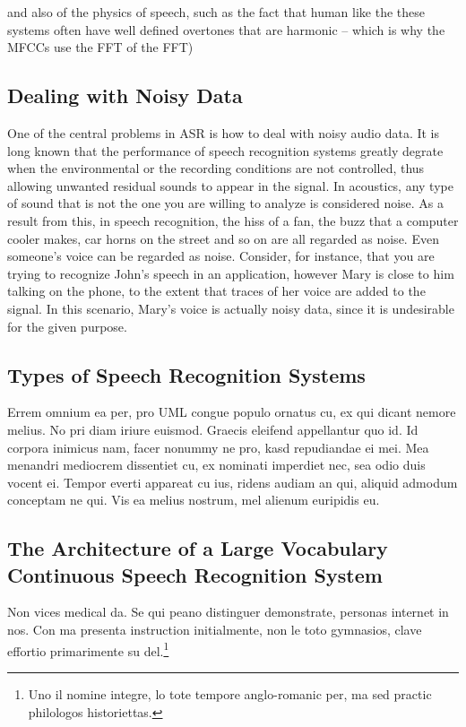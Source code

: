 and also of the physics of speech, such as the fact that human like the these systems often have well defined overtones that are harmonic -- which is why the MFCCs use the FFT of the FFT)


\subsection{Dealing with Noisy Data}

One of the central problems in \ac{ASR} is how to deal with noisy audio data. It is long known that the performance of 
speech recognition systems greatly degrate when the environmental or the recording conditions are not controlled, 
thus allowing unwanted residual sounds to appear in the signal. In acoustics, any type of sound that is not the one
you are willing to analyze is considered noise. As a result from this, in speech recognition, the hiss of a fan, 
the buzz that a computer cooler makes, car horns on the street and so on are all regarded as noise. Even someone's voice
can be regarded as noise. Consider, for instance, that you are trying to recognize John's speech in an application, 
however Mary is close to him talking on the phone, to the extent that traces of her voice are added to the signal. In this
scenario, Mary's voice is actually noisy data, since it is undesirable for the given purpose. 

\subsection{Types of Speech Recognition Systems} 
Errem omnium ea per, pro \ac{UML} congue populo ornatus cu, ex qui
dicant nemore melius. No pri diam iriure euismod. Graecis eleifend
appellantur quo id. Id corpora inimicus nam, facer nonummy ne pro,
kasd repudiandae ei mei. Mea menandri mediocrem dissentiet cu, ex
nominati imperdiet nec, sea odio duis vocent ei. Tempor everti
appareat cu ius, ridens audiam an qui, aliquid admodum conceptam ne
qui. Vis ea melius nostrum, mel alienum euripidis eu.

\subsection{The Architecture of a Large Vocabulary Continuous Speech Recognition System} 
Non vices medical da. Se qui peano distinguer demonstrate, personas
internet in nos. Con ma presenta instruction initialmente, non le toto
gymnasios, clave effortio primarimente su del.\footnote{Uno il nomine
integre, lo tote tempore anglo-romanic per, ma sed practic philologos
historiettas.}


